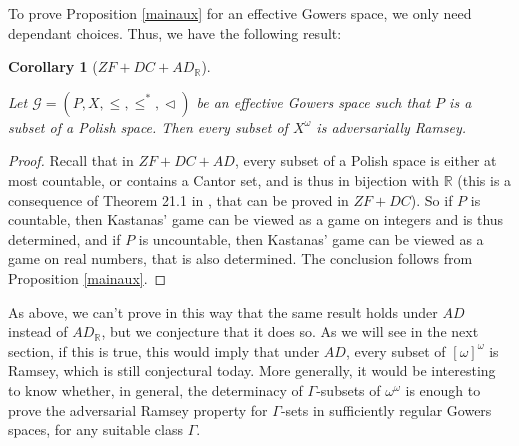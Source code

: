 \documentclass[a4paper,11pt]{article}
\newtheorem{cor}[thm]{Corollary}
\newtheorem{question}[thm]{Question}
\theoremstyle{definition}
\numberwithin{equation}{section}
\newcommand{\R}{\mathbb{R}}
\newcommand{\elinf}{[\omega]^\omega}
\newcommand{\G}{\mathcal{G}}
\begin{document}
To prove Proposition \ref{mainaux} for an effective Gowers space, we only need dependant choices. Thus, we have the following result:

\begin{cor}[$ZF + DC + AD_\R$]\label{AdvAD}

Let $\G = (P, X, \leqslant, \leqslant^*, \vartriangleleft)$ be an effective Gowers space such that $P$ is a subset of a Polish space. Then every subset of $X^\omega$ is adversarially Ramsey.

\end{cor}

\begin{proof}

Recall that in $ZF + DC + AD$, every subset of a Polish space is either at most countable, or contains a Cantor set, and is thus in bijection with $\R$ (this is a consequence of Theorem 21.1 in \cite{kechris}, that can be proved in $ZF + DC$). So if $P$ is countable, then Kastanas' game can be viewed as a game on integers and is thus determined, and if $P$ is uncountable, then Kastanas' game can be viewed as a game on real numbers, that is also determined. The conclusion follows from Proposition \nolinebreak \ref{mainaux}.

\end{proof}

As above, we can't prove in this way that the same result holds under $AD$ instead of $AD_\R$, but we conjecture that it does so. As we will see in the next section, if this is true, this would imply that under $AD$, every subset of $\elinf$ is Ramsey, which is still conjectural today. More generally, it would be interesting to know whether, in general, the determinacy of $\Gamma$-subsets of $\omega^\omega$ is enough to prove the adversarial Ramsey property for $\Gamma$-sets in sufficiently regular Gowers spaces, for any suitable class $\Gamma$.



\end{document}
